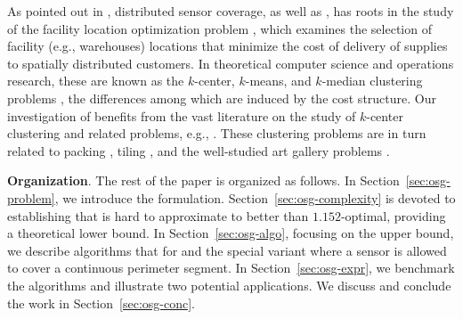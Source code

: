 As pointed out in \cite{cortes2004coverage,schwager2009decentralized}, 
distributed sensor coverage, as well as \osgt, has roots in the study 
of the facility location optimization problem 
\cite{weber1929theory,drezner1995facility}, which examines the selection 
of facility (e.g., warehouses) locations that minimize the cost of delivery 
of supplies to spatially distributed customers. In theoretical computer 
science and operations research, these are known as the $k$-center, 
$k$-means, and $k$-median clustering problems \cite{har2011geometric}, 
the differences among which are induced by the cost structure. Our 
investigation of \osgt benefits from the vast literature on 
the study of $k$-center clustering and related problems, e.g., 
\cite{feder1988optimal,hochbaum1985best,gonzalez1985clustering,daskin2000new,shamos1975closest}.
%
These clustering problems are in turn related to packing 
\cite{hales2005proof}, tiling \cite{thue1910dichteste}, and the 
well-studied art gallery problems \cite{o1987art,shermer1992recent}.

\textbf{Organization}. The rest of the paper is organized as follows. 
In Section~\ref{sec:osg-problem}, we introduce the \osgt formulation. 
Section~\ref{sec:osg-complexity} is devoted to establishing that \osgt is 
hard to approximate to better than $1.152$-optimal, providing a theoretical
lower bound. In Section~\ref{sec:osg-algo}, focusing on the upper bound, 
we describe algorithms that for \osgt and the special \opgt variant 
where a sensor is allowed to cover a continuous perimeter segment.
In Section~\ref{sec:osg-expr}, we benchmark the algorithms and illustrate two 
potential applications. We discuss and conclude the work in Section~\ref{sec:osg-conc}.




